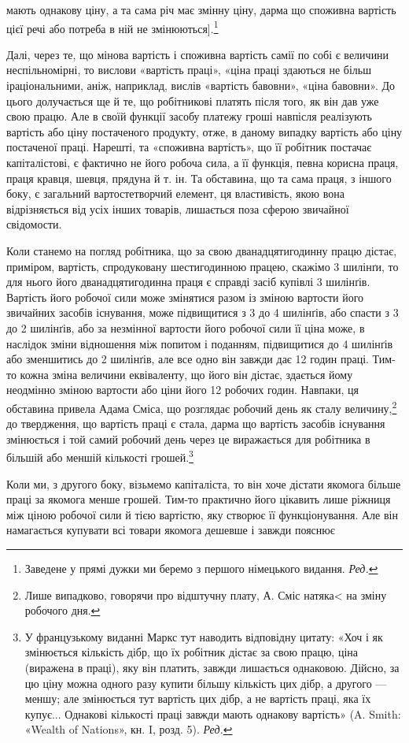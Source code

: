 \parcont{}  %
мають однакову ціну, а та сама річ має змінну ціну, дарма що
споживна вартість цієї речі або потреба в ній не змінюються].\footnote*{
Заведене у прямі дужки ми беремо з першого німецького видання. \emph{Ред.}
}

Далі, через те, що мінова вартість і споживна вартість самії
по собі є величини неспільномірні, то вислови «вартість праці»,
«ціна праці здаються не більш іраціональними, аніж, наприклад,
вислів «вартість бавовни», «ціна бавовни». До цього долучається
ще й те, що робітникові платять після того, як він дав
уже свою працю. Але в своїй функції засобу платежу гроші
навпісля реалізують вартість або ціну постаченого продукту,
отже, в даному випадку вартість або ціну постаченої праці.
Нарешті, та «споживна вартість», що її робітник постачає капіталістові,
є фактично не його робоча сила, а її функція, певна
корисна праця, праця кравця, шевця, прядуна й т. ін. Та обставина,
що та сама праця, з іншого боку, є загальний вартостетворчий
елемент, ця властивість, якою вона відрізняється від усіх
інших товарів, лишається поза сферою звичайної свідомости.

Коли станемо на погляд робітника, що за свою дванадцятигодинну
працю дістає, приміром, вартість, спродуковану шестигодинною
працею, скажімо 3 шилінґи, то для нього його дванадцятигодинна
праця є справді засіб купівлі 3 шилінґів. Вартість
його робочої сили може змінятися разом із зміною вартости його
звичайних засобів існування, може підвищитися з 3 до 4 шилінґів,
або спасти з 3 до 2 шилінґів, або за незмінної вартости його робочої
сили її ціна може, в наслідок зміни відношення між попитом
і поданням, підвищитися до 4 шилінґів або зменшитись до 2 шилінґів,
але все одно він завжди дає 12 годин праці. Тим-то кожна
зміна величини еквіваленту, що його він дістає, здається йому
неодмінно зміною вартости або ціни його 12 робочих годин.
Навпаки, ця обставина привела Адама Сміса, що розглядає
робочий день як сталу величину,\footnote{
Лише випадково, говорячи про відштучну плату, А. Сміс натяка<
на зміну робочого дня.
} до твердження, що вартість
праці є стала, дарма що вартість засобів існування змінюється
і той самий робочий день через це виражається для робітника
в більшій або меншій кількості грошей.\footnote*{
У французькому виданні Маркс тут наводить відповідну цитату:
«Хоч і як змінюється кількість дібр, що їх робітник дістає за свою
працю, ціна (виражена в праці), яку він платить, завжди лишається
однаковою. Дійсно, за цю ціну можна одного разу купити більшу кількість
цих дібр, а другого — меншу; але змінюється тут вартість цих
дібр, а не вартість праці, яка їх купує... Однакові кількості праці
завжди мають однакову вартість» (A. Smith: «Wealth of Nations», кн. I,
розд. 5). \emph{Ред.}
}

Коли ми, з другого боку, візьмемо капіталіста, то він хоче
дістати якомога більше праці за якомога менше грошей. Тим-то
практично його цікавить лише ріжниця між ціною робочої сили
й тією вартістю, яку створює її функціонування. Але він намагається
купувати всі товари якомога дешевше і завжди пояснює
\parbreak{}  %
